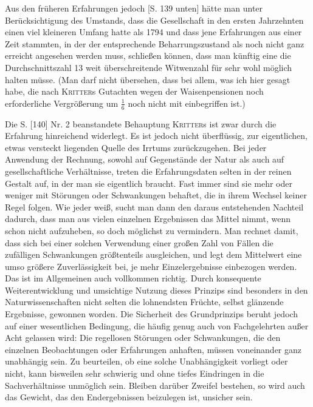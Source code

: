 \par{}\noindent
Aus den früheren Erfahrungen jedoch [S. 139 unten] hätte man unter Berücksichtigung des Umstands, dass die Gesellschaft in den ersten Jahrzehnten einen viel kleineren Umfang hatte als 1794 und dass jene Erfahrungen aus einer Zeit stammten, in der der entsprechende Beharrungszustand als noch nicht ganz erreicht angesehen werden muss, schließen können, dass man künftig eine die Durchschnittszahl 13 weit überschreitende Witwenzahl für sehr wohl möglich halten müsse. (Man darf nicht übersehen, dass bei allem, was ich hier gesagt habe, die nach \textsc{Kritter}s Gutachten wegen der Waisenpensionen noch erforderliche Vergrößerung um \(\tfrac16\) noch nicht mit einbegriffen ist.)

Die S. [140] Nr. 2 beanstandete Behauptung \textsc{Kritter}s ist zwar durch die Erfahrung hinreichend widerlegt. Es ist jedoch nicht überflüssig, zur eigentlichen, etwas versteckt liegenden Quelle des Irrtums zurückzugehen. Bei jeder Anwendung der Rechnung, sowohl auf Gegenstände der Natur als auch auf gesellschaftliche Verhältnisse, treten die Erfahrungsdaten selten in der reinen Gestalt auf, in der man sie eigentlich braucht. Fast immer sind sie mehr oder weniger mit Störungen oder Schwankungen behaftet, die in ihrem Wechsel keiner Regel folgen. Wie jeder weiß, sucht man dann den daraus entstehenden Nachteil dadurch, dass man aus vielen einzelnen Ergebnissen das Mittel nimmt, wenn schon nicht aufzuheben, so doch möglichst zu vermindern. Man rechnet damit, dass sich bei einer solchen Verwendung einer großen Zahl von Fällen die zufälligen Schwankungen größtenteils ausgleichen, und legt dem Mittelwert eine umso größere Zuverlässigkeit bei, je mehr Einzelergebnisse einbezogen werden. Das ist im Allgemeinen auch vollkommen richtig. Durch konsequente Weiterentwicklung und umsichtige Nutzung dieses Prinzips sind besonders in den Naturwissenschaften nicht selten die lohnendsten Früchte, selbst glänzende Ergebnisse, gewonnen worden. Die Sicherheit des Grundprinzips beruht jedoch auf einer wesentlichen Bedingung, die häufig genug auch von Fachgelehrten außer Acht gelassen wird: Die regellosen Störungen oder Schwankungen, die den einzelnen Beobachtungen oder Erfahrungen anhaften, müssen voneinander ganz unabhängig sein. Zu beurteilen, ob eine solche Unabhängigkeit vorliegt oder nicht, kann bisweilen sehr schwierig und ohne tiefes Eindringen in die Sachverhältnisse unmöglich sein. Bleiben darüber Zweifel bestehen, so wird auch das Gewicht, das den Endergebnissen beizulegen ist, unsicher sein.

